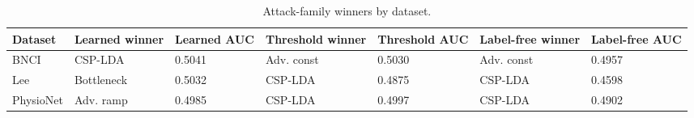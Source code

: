\begin{table}[t]
\centering
\caption{Attack-family winners by dataset.}
\label{tab:attack-family-winners}
\begin{tabular}{lllllll}
\toprule
Dataset & Learned winner & Learned AUC & Threshold winner & Threshold AUC & Label-free winner & Label-free AUC \\
\midrule
BNCI & CSP-LDA & 0.5041 & Adv. const & 0.5030 & Adv. const & 0.4957 \\
Lee & Bottleneck & 0.5032 & CSP-LDA & 0.4875 & CSP-LDA & 0.4598 \\
PhysioNet & Adv. ramp & 0.4985 & CSP-LDA & 0.4997 & CSP-LDA & 0.4902 \\
\bottomrule
\end{tabular}
\end{table}
